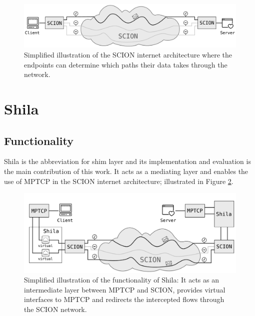 \begin{figure}[H]
	\begin{center}
		\def\svgwidth{1\textwidth}
		\includegraphics[scale=0.28]{../illustrations/introduction/SCION.pdf}
		\caption[]{Simplified illustration of the SCION internet architecture where the endpoints can determine which paths their data takes through the network.}
		\label{fig:IntroSCION}
	\end{center}
\end{figure}

\section{Shila}

\subsection*{Functionality}

Shila is the abbreviation for shim layer and its implementation and evaluation is the main contribution of this work. It acts as a mediating layer and enables the use of MPTCP in the SCION internet architecture; illustrated in Figure \ref{fig:IntroRoleOfShila}. 

\begin{figure}[H]
	\begin{center}
		\def\svgwidth{1\textwidth}
		\includegraphics[scale=0.28]{../illustrations/introduction/Shila.pdf} 
		\caption[]{Simplified illustration of the functionality of Shila: It acts as an intermediate layer between MPTCP and SCION, provides virtual interfaces to MPTCP and redirects the intercepted flows through the SCION network.}
		\label{fig:IntroRoleOfShila}
	\end{center}
\end{figure}

